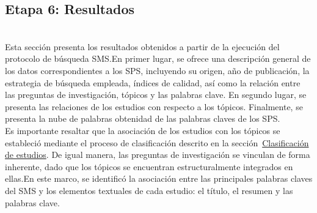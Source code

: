 \subsection{Etapa 6: Resultados}
\mbox{}\\
Esta sección presenta los resultados obtenidos a partir de la ejecución del protocolo de búsqueda SMS.\@ En primer lugar, se ofrece una descripción general de los datos correspondientes a los SPS, incluyendo su origen, año de publicación, la estrategia de búsqueda empleada, índices de calidad, así como la relación entre las preguntas de investigación, tópicos y las palabras clave. 
En segundo lugar, se presenta las relaciones de los estudios con respecto a los tópicos.
Finalmente, se presenta la nube de palabras obtenidad de las palabras claves de los SPS. \\
Es importante resaltar que la asociación de los estudios con los tópicos se estableció mediante el proceso de clasificación descrito en la sección~\hyperref[sec:clasificacion-estudios]{Clasificación de estudios}. De igual manera, las preguntas de investigación se vinculan de forma inherente, dado que los tópicos se encuentran estructuralmente integrados en ellas.\@ En este marco, se identificó la asociación entre las principales palabras claves del SMS y los elementos textuales de cada estudio: el título, el resumen y las palabras clave.
\mbox{}\\

